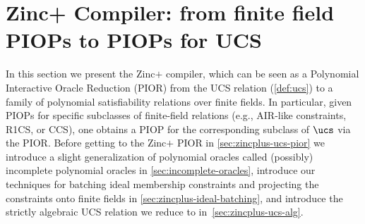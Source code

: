 \section{Zinc+ Compiler: from finite field PIOPs to PIOPs for UCS}
\label{sec:zincplus-pior}

In this section we present the Zinc$+$ compiler, which can be seen as a Polynomial Interactive Oracle Reduction (PIOR) from the UCS relation (\cref{def:ucs}) to a family of polynomial satisfiability relations over finite fields. In particular, given PIOPs for specific subclasses of finite-field relations (e.g., AIR-like constraints, R1CS, or CCS), one obtains a PIOP for the corresponding subclass of $\ucs$ via the PIOR. Before getting to the Zinc$+$ PIOR in \cref{sec:zincplus-ucs-pior} we introduce a slight generalization of polynomial oracles called (possibly) incomplete polynomial oracles in \cref{sec:incomplete-oracles}, introduce our techniques for batching ideal membership constraints and projecting the constraints onto finite fields in \cref{sec:zincplus-ideal-batching}, and introduce the strictly algebraic UCS relation we reduce to in~\cref{sec:zincplus-ucs-alg}.





%

